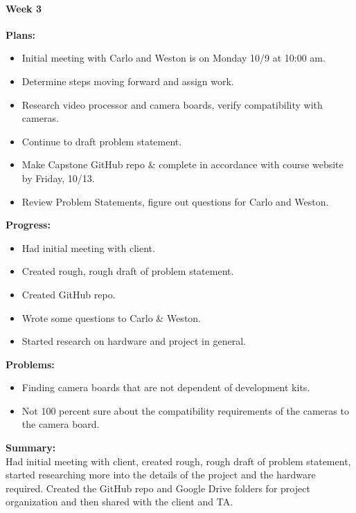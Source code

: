 \paragraph{Week 3}
\begin{adjustwidth}{2.5em}{0pt}
    \vspace{-0.5cm}\textbf{Plans:}
    \vspace{-0.5cm}
    \begin{itemize}
        \item Initial meeting with Carlo and Weston is on Monday 10/9 at 10:00 am. 
		\item Determine steps moving forward and assign work.
		\item Research video processor and camera boards, verify compatibility with cameras. 
		\item Continue to draft problem statement.
		\item Make Capstone GitHub repo \& complete in accordance with course website by Friday, 10/13. 
		\item Review Problem Statements, figure out questions for Carlo and Weston.  
    \end{itemize} 
    \vspace{-0.3cm}\textbf{Progress:}
    \vspace{-0.5cm}
    \begin{itemize}
        \item Had initial meeting with client.
		\item Created rough, rough draft of problem statement.
		\item Created GitHub repo.
		\item Wrote some questions to Carlo \& Weston.
		\item Started research on hardware and project in general.
    \end{itemize} 
    \vspace{-0.3cm}\textbf{Problems:}
    \vspace{-0.5cm}
    \begin{itemize}
        \item Finding camera boards that are not dependent of development kits.
		\item Not 100 percent sure about the compatibility requirements of the cameras to the camera board.
    \end{itemize}  
    \vspace{-0.3cm}\noindent\textbf{Summary:}\\
    \noindent Had initial meeting with client, created rough, rough draft of problem statement, started researching more into the details of the project and the hardware required. Created the GitHub repo and Google Drive folders for project organization and then shared with the client and TA. 
\end{adjustwidth} 

